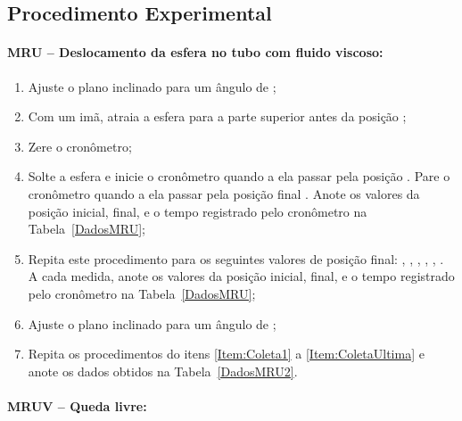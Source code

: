 \subsection{Procedimento Experimental}

\paragraph{MRU -- Deslocamento da esfera no tubo com fluido viscoso:}

\begin{enumerate}
	\item Ajuste o plano inclinado para um ângulo de ;
	\item Com um imã, atraia a esfera para a parte superior antes da posição ;\label{Item:Coleta1}
	\item Zere o cronômetro;
	\item Solte a esfera e inicie o cronômetro quando a ela passar pela posição . Pare o cronômetro quando a ela passar pela posição final . Anote os valores da posição inicial, final, e o tempo registrado pelo cronômetro na Tabela~\ref{DadosMRU};
	\item Repita este procedimento para os seguintes valores de posição final: , , , , , . A cada medida, anote os valores da posição inicial, final, e o tempo registrado pelo cronômetro na Tabela~\ref{DadosMRU};\label{Item:ColetaUltima}
	\item Ajuste o plano inclinado para um ângulo de ;
	\item Repita os procedimentos do itens \ref{Item:Coleta1} a \ref{Item:ColetaUltima} e anote os dados obtidos na Tabela~\ref{DadosMRU2}.
\end{enumerate}

\paragraph{MRUV -- Queda livre:}

